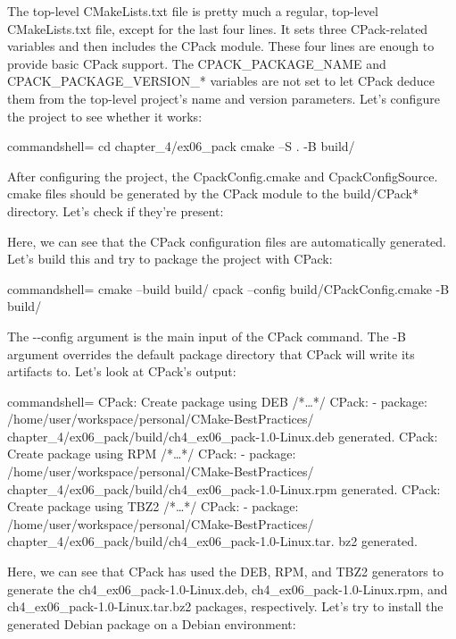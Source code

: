 The top-level CMakeLists.txt file is pretty much a regular, top-level CMakeLists.txt file, except for the last four lines. It sets three CPack-related variables and then includes the CPack module. These four lines are enough to provide basic CPack support. The CPACK\_PACKAGE\_NAME and CPACK\_PACKAGE\_VERSION\_* variables are not set to let CPack deduce them from the top-level project's name and version parameters. Let's configure the project to see whether it works:

\begin{tcblisting}{commandshell={}}
cd chapter_4/ex06_pack
cmake –S . -B build/
\end{tcblisting}

After configuring the project, the CpackConfig.cmake and CpackConfigSource. cmake files should be generated by the CPack module to the build/CPack* directory. Let's check if they're present:


Here, we can see that the CPack configuration files are automatically generated. Let's build this and try to package the project with CPack:

\begin{tcblisting}{commandshell={}}
cmake --build build/
cpack --config build/CPackConfig.cmake -B build/
\end{tcblisting}

The -{}-config argument is the main input of the CPack command. The -B argument overrides the default package directory that CPack will write its artifacts to. Let's look at CPack's output:

\begin{tcblisting}{commandshell={}}
CPack: Create package using DEB
/*…*/
CPack: - package: /home/user/workspace/personal/CMake-BestPractices/
chapter_4/ex06_pack/build/ch4_ex06_pack-1.0-Linux.deb
generated.
CPack: Create package using RPM
/*…*/
CPack: - package: /home/user/workspace/personal/CMake-BestPractices/
chapter_4/ex06_pack/build/ch4_ex06_pack-1.0-Linux.rpm
generated.
CPack: Create package using TBZ2
/*…*/
CPack: - package: /home/user/workspace/personal/CMake-BestPractices/
chapter_4/ex06_pack/build/ch4_ex06_pack-1.0-Linux.tar.
bz2 
generated.
\end{tcblisting}

Here, we can see that CPack has used the DEB, RPM, and TBZ2 generators to generate the ch4\_ex06\_pack-1.0-Linux.deb, ch4\_ex06\_pack-1.0-Linux.rpm, and ch4\_ex06\_pack-1.0-Linux.tar.bz2 packages, respectively. Let's try to install the generated Debian package on a Debian environment: 


